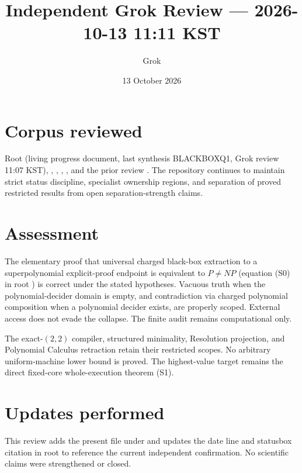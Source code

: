 \documentclass[11pt]{article}
\title{Independent Grok Review --- 2026-10-13 11:11 KST}
\author{Grok}
\date{13 October 2026}
\begin{document}
\maketitle

\begin{center}
\end{center}

\section{Corpus reviewed}
Root  (living progress document, last synthesis BLACKBOXQ1, Grok review 11:07 KST),
, , ,
, and the prior review
.
The repository continues to maintain strict status discipline, specialist ownership regions,
and separation of proved restricted results from open separation-strength claims.

\section{Assessment}
The elementary proof that universal charged black-box extraction to a superpolynomial
explicit-proof endpoint is equivalent to \(P\neq NP\) (equation (S0) in root )
is correct under the stated hypotheses.  Vacuous truth when the polynomial-decider domain
is empty, and contradiction via charged polynomial composition when a polynomial decider
exists, are properly scoped.  External access does not evade the collapse.  The finite
audit remains computational only.

The exact-\((2,2)\) compiler, structured minimality, Resolution projection, and
Polynomial Calculus retraction retain their restricted scopes.  No arbitrary uniform-machine
lower bound is proved.  The highest-value target remains the direct fixed-core whole-execution
theorem (S1).

\section{Updates performed}
This review adds the present file under  and updates
the date line and statusbox citation in root  to reference the current
independent confirmation.  No scientific claims were strengthened or closed.
\end{document}
